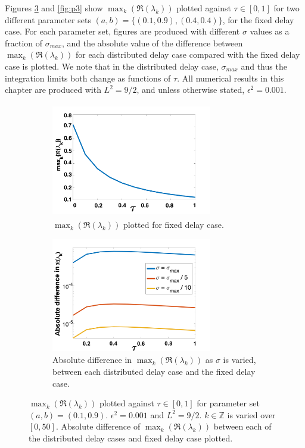 Figures \ref{fig:p2} and \ref{fig:p3} show $\max_k(\Re(\lambda_k))$ plotted against $\tau\in[0,1]$ for two different parameter sets $(a,b)=\{(0.1,0.9), (0.4,0.4)\}$, for the fixed delay case. For each parameter set, figures are produced with different $\sigma$ values as a fraction of $\sigma_{max}$, and the absolute value of the difference between $\max_k(\Re(\lambda_k))$ for each distributed delay case compared with the fixed delay case is plotted. We note that in the distributed delay case,  $\sigma_{max}$ and thus the integration limits both change as functions of $\tau$. All numerical results in this chapter are produced with $L^2=9/2$, and unless otherwise stated, $\epsilon^2=0.001$.

\begin{figure}[H]
    \centering
    \begin{subfigure}[t]{0.45\textwidth}
        \centering
        \includegraphics[width=7cm,height=5cm]{p2fixed.png}
        \caption{$\max_k(\Re(\lambda_k))$ plotted for fixed delay case.}
        \label{}
    \end{subfigure}
    \hfill
    \begin{subfigure}[t]{0.45\textwidth}
        \centering
        \includegraphics[width=7cm,height=5cm]{dispdiff1.png}
        \caption{Absolute difference in $\max_k(\Re(\lambda_k))$ as $\sigma$ is varied, between each distributed delay case and the fixed delay case.}
        \label{}
    \end{subfigure}
    \caption{$\max_k(\Re(\lambda_k))$ plotted against $\tau\in[0,1]$ for parameter set $(a,b)=(0.1,0.9)$. $\epsilon^2=0.001$ and $L^2=9/2$. $k\in\mathbb{Z}$ is varied over $[0,50]$. Absolute difference of $\max_k(\Re(\lambda_k))$ between each of the distributed delay cases and fixed delay case plotted.}
    \label{fig:p2}
\end{figure}
